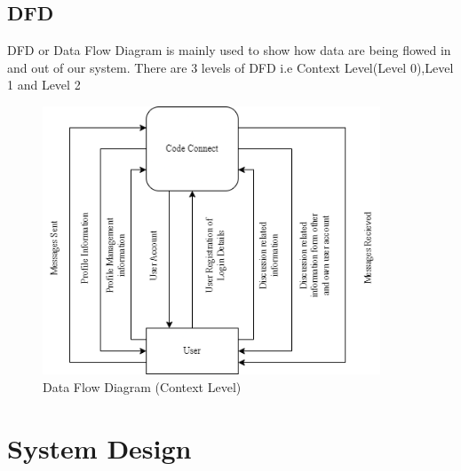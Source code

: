 \subsection{DFD}
DFD or Data Flow Diagram is mainly used to show how data are being flowed in and out of our system. There are 3 levels of DFD i.e Context Level(Level 0),Level 1 and Level 2
\begin{figure}[H]
    \centering
    \includegraphics[height = 8cm]{Diagrams/DFD.drawio.png}
    \caption{Data Flow Diagram (Context Level)}
\end{figure}
\newpage
\section{System Design}
